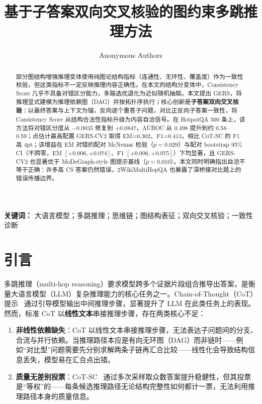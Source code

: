 \documentclass[11pt,a4paper]{ctexart}
\title{\textbf{基于子答案双向交叉核验的图约束多跳推理方法}}
\author{Anonymous Authors}
\date{}
\begin{document}
\maketitle

\begin{abstract}
\noindent
部分图结构增强推理变体使用纯图论结构指标（连通性、无环性、覆盖度）作为一致性校验，但这类指标不一定反映推理内容正确性。在本文的结构分变体中，Consistency Score 几乎不具备对错区分能力，多路选优退化为近似随机抽取。本文提出 GERS，将推理显式建模为推理依赖图（DAG）并按拓扑序执行；核心创新是\textbf{子答案双向交叉核验}：以最终答案与上下文为锚，反向逐个重答子问题，对比正反向子答案一致性，将 Consistency Score 从结构合法性指标升级为内容自洽信号。在 HotpotQA 500 条上，该方法将对错区分度从 $-0.0035$ 修复到 $+0.0847$，AUROC 从 0.498 提升到约 0.58--0.59；点估计最高配置 GERS-CV2 取得 EM=0.302、F1=0.413，相比 CoT-SC 的 F1 高 4pt；该增益在 EM 对错的配对 McNemar 检验（$p=0.029$）与配对 bootstrap 95\% CI（不跨零，EM $[+0.006,+0.074]$、F1 $[+0.006,+0.075]$）下均显著，且 GERS-CV2 也显著优于 MoDeGraph-style 图提示基线（$p=0.010$）。本文同时明确指出自洽不等于正确：许多高 CS 答案仍然错误，2WikiMultiHopQA 也暴露了深桥接对比题上的错误传播边界。
\end{abstract}

\noindent\textbf{关键词：} 大语言模型；多跳推理；思维链；图结构表征；双向交叉核验；一致性诊断

\section{引言}

多跳推理（multi-hop reasoning）要求模型跨多个证据片段组合推导出答案，是衡量大语言模型（LLM）复杂推理能力的核心任务之一。Chain-of-Thought（CoT）提示~\cite{wei2022cot} 通过引导模型输出中间推理步骤，显著提升了 LLM 在此类任务上的表现。然而，标准 CoT 以\textbf{线性文本}串接推理步骤，存在两类核心不足：

\begin{enumerate}[label=\arabic*.]
\item \textbf{非线性依赖缺失}：CoT 以线性文本串接推理步骤，无法表达子问题间的分支、合流与并行依赖。当推理路径本应是有向无环图（DAG）而非链时——例如``对比型''问题需要先分别求解两条子链再汇合比较——线性化会导致结构信息丢失，模型易在汇合点出错。
\item \textbf{质量无差别投票}：CoT-SC~\cite{wang2023sc} 通过多次采样取众数答案提升稳健性，但其投票是``等权''的——每条候选推理路径无论结构完整性如何都计一票，无法利用推理路径本身的质量信息。
\end{enumerate}
\end{document}
